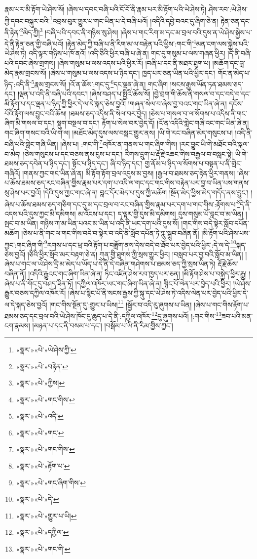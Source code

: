 རྣམ་པར་མི་རྟོག་ཡེ་ཤེས་སོ། །ཞེས་པ་དབང་བཞི་པའི་ངོ་བོ་ནི་རྣམ་པར་མི་རྟོག་པའི་ཡེ་ཤེས་ཏེ། ཤེས་རབ་:ཡེ་ཤེས་ཀྱི་དབང་བསྐུར་བའི་\footnote{«སྣར་»«པེ་»ཡེ་ཤེས་ཀྱི་}འབྲས་བུར་གྱུར་པ་གང་ཡིན་པ་དེ་བཞི་པའོ། །འདིའི་དབྱེ་བའང་དུ་ཞིག་ཅེ་ན། རྟེན་ཅན་དང་ནི་རྟེན་\footnote{«སྣར་»«པེ་»བརྟེན་}མེད་ཀྱི།\footnote{«སྣར་»«པེ་»ཀྱིས།} །བཞི་པའི་དབང་ནི་གཉིས་སུ་ཤེས། །ཞེས་པ་གང་རིག་མ་དང་མ་བྲལ་བའི་དུས་ན་ཡེ་ཤེས་སྐྱེས་པ་དེ་ནི་རྟེན་ཅན་གྱི་བཞི་པའོ། །རྟེན་མེད་ཀྱི་བཞི་པ་ནི་རིག་མ་ལ་བརྟེན་པའི་ཕྱིས་:གང་གི་\footnote{«སྣར་»«པེ་»གང་གིས་}མན་ངག་ལས་སྐྱེས་པའི་ཡེ་ཤེས་ཏེ། འདི་ལྟར་གཉིས་པ་ཁོ་ནའོ། །འདི་ཅིའི་ཕྱིར་བཞི་པ་ཞེ་ན། གང་དུ་གསུམ་པ་ལས་གཞན་ཕྱིར། །དེ་ནི་བཞི་པའི་དབང་ཞེས་གྲགས། །ཞེས་གསུམ་པ་ལས་འདས་པའི་ཕྱིར་རོ། །བཞི་པ་དང་ནི་མཐར་ཐུག་པ། །མཆོག་དང་བླ་མེད་རྣམ་གྲངས་སོ། །ཞེས་པ་གསུམ་པ་ལས་འདས་པ་ཉིད་དང་། ཁྱད་པར་ཅན་ཡིན་པའི་ཕྱིར་དང་། གོང་ན་མེད་པ་ཉིད་:འདི་ནི་\footnote{«སྣར་»«པེ་»འདི་}རྣམ་གྲངས་སོ། །འོ་ན་ཆོས་:གང་དུ་\footnote{«སྣར་»«པེ་»གང་}དང་ལྡན་ཞེ་ན། གང་ཞིག །སངས་རྒྱས་ཡོན་ཏན་ཐམས་ཅད་དང་། །ལྡན་པ་འདི་ནི་བཞི་པའི་དབང་། །ཞེས་བཤད་པ་སྤྱིའི་ཆོས་སོ། །བྱེ་བྲག་གི་ཆོས་ནི་གསལ་བ་དང་བདེ་བ་དང་མི་རྟོག་པ་དང་ལྡན་པ་ཉིད་ཀྱི་ཕྱིར་དེ་ལ་དེ་སྐད་ཅེས་བྱའོ། །གཞན་སེལ་བ་ཞེས་བྱ་བའང་གང་ཡིན་ཞེ་ན། དངོས་པོའི་རྟོག་ལས་བྱུང་བའི་ཆོས། །ཐམས་ཅད་འདིས་ནི་སེལ་བར་བྱེད། །ཅེས་པ་གསལ་བ་ལ་སོགས་པ་འདིས་ནི་གང་ཞིག་མི་གསལ་བ་དང་། སྡུག་བསྔལ་བ་དང་། རྟོག་པ་སེལ་བར་བྱེད་དོ། །འོ་ན་འདིའི་གླེང་གཞི་འང་གང་ཡིན་ཞེ་ན། གང་ཞིག་གསང་བའི་ཡི་གེ་ལ། །མཐོང་མེད་དུས་ལས་བསླང་གྱུར་ནས། །ཡི་གེ་རང་བཞིན་མེད་གསུངས་པ། །འདི་ནི་བཞི་པའི་གླེང་གཞི་ཡིན། །ཞེས་པ། :གང་གི་\footnote{«སྣར་»«པེ་»གང་གིས་}འཁོར་ན་གནས་པ་གང་ཞིག་གིས། །རང་བྱུང་ཡི་གེ་མཐོང་བའི་སྐལ་བ་མེད། །ཅེས་གསུངས་པ་དང་བཅས་ནས་ངུས་པ་དང་། རིགས་དྲུག་པ་རྡོ་རྗེ་འཆང་གིས་བརྒྱལ་བ་བསླང་སྟེ། ཡི་གེ་ཐམས་ཅད་དབེན་པ་ཉིད་དང་། སྟོང་པ་ཉིད་དང་། ཞི་བ་ཉིད་དང་། གྱ་ནོམ་པ་ཉིད་ལ་སོགས་པ་བསྟན་པ་ནི་གླེང་གཞིའོ། །གནས་ཀྱང་གང་ཡིན་ཞེ་ན། མི་རྟོག་རྟོག་བྲལ་འདུས་མ་བྱས། །རྒྱལ་བ་ཐམས་ཅད་རྟེན་ཕྱིར་གནས། །ཞེས་པ་ཆོས་ཐམས་ཅད་རང་བཞིན་གྱིས་རྣམ་པར་དག་པ་འདི་ལ་གང་དང་གང་གིས་བརྟེན་པར་བྱ་བ་ཡིན་པས་གནས་སུ་ཤེས་པར་བྱའོ། །དེའི་དུས་ཀྱང་གང་ཞེ་ན། བླང་དོར་མེད་པ་དུས་ཀྱི་མཆོག །སྔོན་མེད་ཕྱིས་མེད་གདོད་ནས་བྱུང་། །ཞེས་པ་ཆོས་ཐམས་ཅད་གཅིག་དང་དུ་མ་དང་བྲལ་བ་རང་བཞིན་གྱིས་རྣམ་པར་དག་པ་གང་གིས་:རྟོགས་པ་\footnote{«སྣར་»«པེ་»རྟོག་པ་}དེ་ནི་འདས་པའི་དུས་ཀྱང་མི་དམིགས། མ་འོངས་པ་དང་། ད་ལྟར་གྱི་དུས་མི་དམིགས། དུས་གསུམ་པོ་བླང་བ་མ་ཡིན། །སྤང་བ་མ་ཡིན། གཉིས་ཀ་མ་ཡིན་པའང་མ་ཡིན་པ་འདི་ནི་ཡང་དག་པའི་དུས་སོ། །གང་གིས་བདེ་སྟེར་སློབ་དཔོན་མཆོག །ཅེས་པ་ནི་གང་ལ་གང་གིས་བདེ་བ་སྟེར་བ་འདི་ནི་སློབ་དཔོན་ཏེ་ཀླུ་སྒྲུབ་བཞིན་ནོ། །མི་རྟོག་པའི་ཤེས་པས་ཀྱང་:གང་ཞིག་གི་\footnote{«སྣར་»«པེ་»གང་ཞིག་གིས་}རགས་པ་དང་ཕྲ་བའི་རྟོག་པ་བཟློག་ནས་དེས་བདེ་བ་ཐོབ་པར་བྱེད་པའི་ཕྱིར་:དེ་ལ་དེ་\footnote{«སྣར་»«པེ་»དེ་}སྐད་ཅེས་བྱའོ། །ཅིའི་ཕྱིར་སློབ་མར་བརྟག་ཅེ་ན། ཀུན་གྱི་ཐུགས་ཀྱི་སྲས་གྱུར་ཕྱིར། །བསླབ་པར་བྱ་བའི་སློབ་མ་ཡིན། །ཞེས་པ་གང་ལ་ཡེ་ཤེས་དྲི་མ་མེད་པ་ཡོད་པ་དེ་ནི་དེ་བཞིན་གཤེགས་པ་ཐམས་ཅད་ཀྱི་སྲས་ཡིན་ཏེ། རྡོ་རྗེ་ཆོས་བཞིན་ནོ། །འདིའི་རྒྱུའང་གང་ཞིག་ཡིན་ཞེ་ན། ཏིང་འཛིན་ཤེས་རབ་ཁྱད་པར་ཅན། །མི་རྟོག་ཤེས་པ་བསྐྱེད་ཕྱིར་རྒྱུ། །ཞེས་པ་ནི་གོང་དུ་བཤད་ཟིན་ཏོ། །དཀྱིལ་འཁོར་ཡང་གང་ཞིག་ཡིན་ཞེ་ན། སྙིང་པོ་ལེན་པར་བྱེད་པའི་ཕྱིར། །ཡེ་ཤེས་རྒྱུར་བཅས་དཀྱིལ་འཁོར་རོ། །ཞེས་པ་སྙིང་པོ་ནི་སངས་རྒྱས་ཀྱི་སྐུ་དང་ཡེ་ཤེས་ཏེ་འདིས་ལེན་པར་བྱེད་པའི་ཕྱིར་དེ་ལ་དེ་སྐད་ཅེས་བྱའོ། །གང་གིས་སྔོན་དུ་:གྱུར་པ་ཡིས།\footnote{«སྣར་»«པེ་»གྱུར་པ་ཡི།} །སྦྱོར་བ་འདི་རུ་ཞུགས་པ་ཡིན། །ཞེས་པ་གང་གིས་རྟོག་པ་ཐམས་ཅད་དང་བྲལ་བའི་ཡེ་ཤེས་ཁོང་དུ་ཆུད་པ་དེ་ནི་:དཀྱིལ་འཁོར་\footnote{«སྣར་»«པེ་»དཀྱིལ་}དུ་ཞུགས་པའོ། །:གང་གིས་\footnote{«སྣར་»«པེ་»གང་གི་}ཟབ་པའི་མན་ངག་རྣམས། །མཉན་པ་དང་ནི་བསམ་པ་དང་། །བསྒོམ་པ་ཡི་ནི་རིམ་གྱིས་ཀྱང་། 